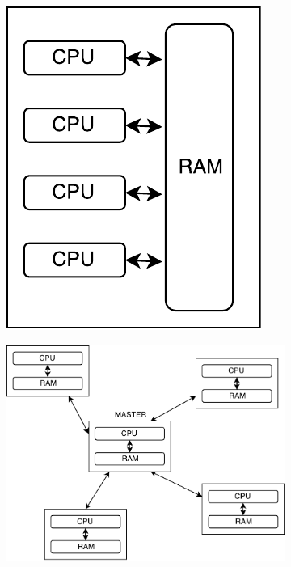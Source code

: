 

\begin{figure}[h]
	\centering
	\begin{subfigure}{0.4\textwidth}
		\centering
		\includegraphics[scale=0.6]{parallel.pdf}
		\subcaption{\label{subfigure_a}}
	\end{subfigure}
	\begin{subfigure}{0.5\textwidth}
		\centering
		\includegraphics[scale=0.5]{decentralized.pdf}
		\subcaption{\label{subfigure_b}}
	\end{subfigure}
	\begin{subfigure}{0.6\textwidth}

\end{subfigure}
\end{figure}
